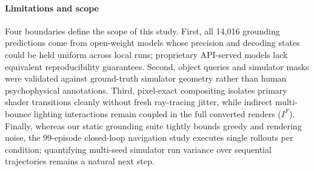 \paragraph{Limitations and scope}
Four boundaries define the scope of this study. First, all 14,016 grounding predictions come from open-weight models whose precision and decoding states could be held uniform across local runs; proprietary API-served models lack equivalent reproducibility guarantees. Second, object queries and simulator masks were validated against ground-truth simulator geometry rather than human psychophysical annotations. Third, pixel-exact compositing isolates primary shader transitions cleanly without fresh ray-tracing jitter, while indirect multi-bounce lighting interactions remain coupled in the full converted renders ($I^F$). Finally, whereas our static grounding suite tightly bounds greedy and rendering noise, the 99-episode closed-loop navigation study executes single rollouts per condition; quantifying multi-seed simulator run variance over sequential trajectories remains a natural next step.
